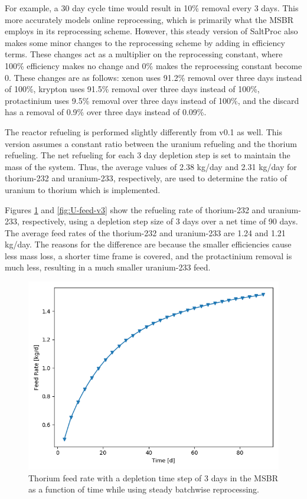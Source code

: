 For example, a 30 day cycle time would result in 10\% removal every 3 days. This more accurately models online reprocessing, which is primarily what the MSBR employs in its reprocessing scheme. However, this steady version of SaltProc also makes some minor changes to the reprocessing scheme by adding in efficiency terms. These changes act as a multiplier on the reprocessing constant, where 100\% efficiency makes no change and 0\% makes the reprocessing constant become 0. These changes are as follows: xenon uses 91.2\% removal over three days instead of 100\%, krypton uses 91.5\% removal over three days instead of 100\%, protactinium uses 9.5\% removal over three days instead of 100\%, and the discard has a removal of 0.9\% over three days instead of 0.09\%.

The reactor refueling is performed slightly differently from v0.1 as well. This version assumes a constant ratio between the uranium refueling and the thorium refueling. The net refueling for each 3 day depletion step is set to maintain the mass of the system. Thus, the average values of 2.38 kg/day and 2.31 kg/day for thorium-232 and uranium-233, respectively, are used to determine the ratio of uranium to thorium which is implemented.

Figures \ref{fig:Th-feed-v3} and \ref{fig:U-feed-v3} show the refueling rate of thorium-232 and uranium-233, respectively, using a depletion step size of 3 days over a net time of 90 days. The average feed rates of the thorium-232 and uranium-233 are 1.24 and 1.21 kg/day. The reasons for the difference are because the smaller efficiencies cause less mass loss, a shorter time frame is covered, and the protactinium removal is much less, resulting in a much smaller uranium-233 feed.

\begin{figure}[H]
  \centering
  \includegraphics[scale=0.5]{images/feed_Th232_3d_90d.png}
  \caption{Thorium feed rate with a depletion time step of 3 days in the MSBR as a function of time while using steady batchwise reprocessing.}
   \label{fig:Th-feed-v3}
\end{figure}

